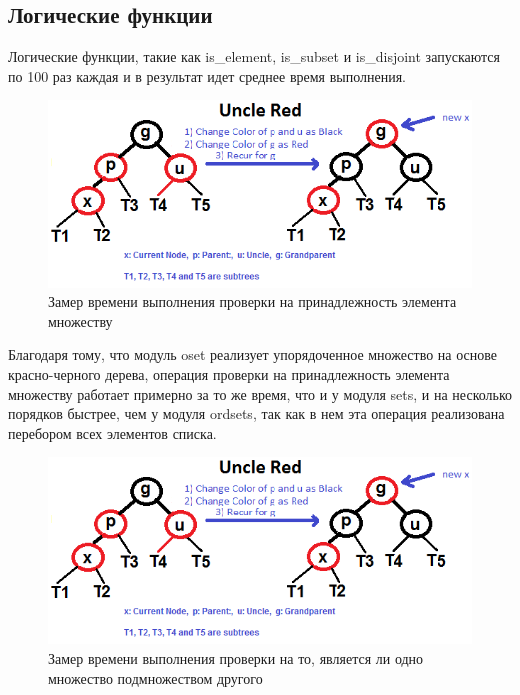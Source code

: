	\subsection{Логические функции}
		Логические функции, такие как is_element, is_subset и is_disjoint запускаются по 100 раз
		каждая и в результат идет среднее время выполнения.
		\begin{figure}[H]
				\centering
				\includegraphics[width=\textwidth]{img/tan-aus.png}
				\caption{Замер времени выполнения проверки на принадлежность элемента множеству}
		\end{figure}
		Благодаря тому, что модуль oset реализует упорядоченное множество на основе красно-черного дерева, операция
		проверки на принадлежность элемента множеству работает примерно за то же время, что и у модуля sets, и на 
		несколько порядков быстрее, чем у модуля ordsets, так как в нем эта операция реализована перебором всех элементов
		списка.  
		
		\begin{figure}[H]
				\centering
				\includegraphics[width=\textwidth]{img/tan-aus.png}
				\caption{Замер времени выполнения проверки на то, является ли одно множество подмножеством другого}
		\end{figure}
		
